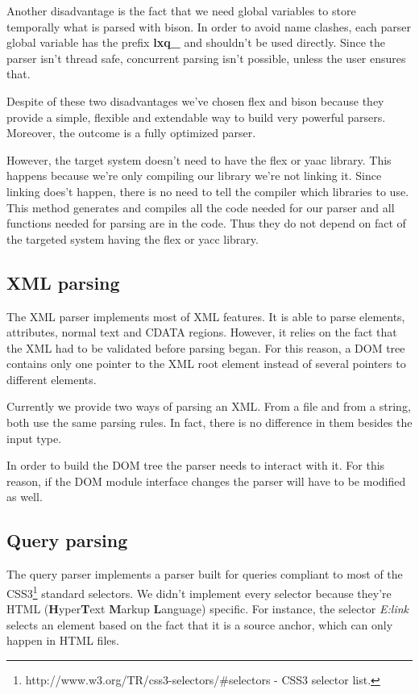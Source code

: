 \documentclass[a4paper]{report}
\begin{document}
	Another disadvantage is the fact that we need global variables to store temporally what is parsed with bison. In order to avoid name clashes, each parser global variable has the prefix \textbf{lxq\_} and shouldn't be used 
	directly. Since the parser isn't thread safe, concurrent parsing isn't possible, unless the user ensures that.
	
	Despite of these two disadvantages we've chosen flex and bison because they provide a simple, flexible and extendable way to build very powerful parsers. Moreover, the outcome is a fully optimized parser.
	
	However, the target system doesn't need to have the flex or yaac library. This happens because we're only compiling our library we're not linking it. Since linking does't happen, there is no need to tell the compiler which 
	libraries to use. This method generates and compiles all the code needed for our parser and all functions needed for parsing are in the code. Thus they do not depend on fact of the targeted system having the flex or yacc 
	library.

	\subsection{XML parsing}
		The XML parser implements most of XML features. It is able to parse elements, attributes, normal text and CDATA regions. However, it relies on the fact that the XML had to be validated before parsing began. For this 
		reason, a DOM tree contains only one pointer to the XML root element instead of several pointers to different elements.
	
		Currently we provide two ways of parsing an XML. From a file and from a string, both use the same parsing rules. In fact, there is no difference in them besides the input type.
		
		In order to build the DOM tree the parser needs to interact with it. For this reason, if the DOM module interface changes the parser will have to be modified as well.
	
	\subsection{Query parsing}	
		The query parser implements a parser built for queries compliant to most of the CSS3\footnote{http://www.w3.org/TR/css3-selectors/\#selectors - CSS3 selector list.} standard selectors. We didn't implement every
		selector because they're HTML (\textbf{H}yper\textbf{T}ext \textbf{M}arkup \textbf{L}anguage) specific. For instance, the selector \emph{E:link} selects an element based on the fact that it is a source anchor, which can 
		only happen in HTML files. 
	
\end{document}
